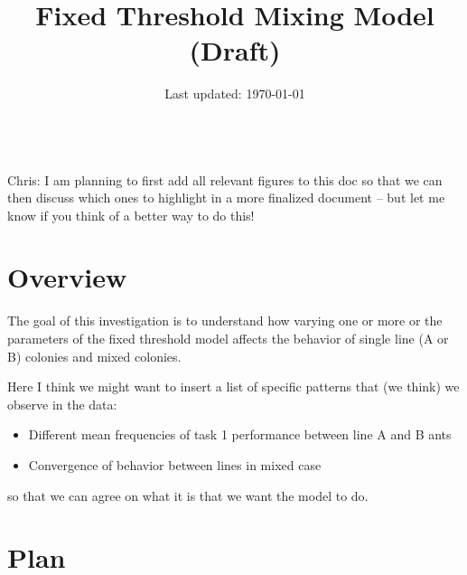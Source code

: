 \documentclass[11pt]{article}
\title{Fixed Threshold Mixing Model ({\color{red}Draft})}
\author{\hspace{0pt}\vspace{-30pt}}
\date{Last updated: \today}
\begin{document}
\maketitle

\tableofcontents
\hspace{0pt}\\
{\color{red}Chris: I am planning to first add all relevant figures to this doc so that we can then discuss which ones to highlight in a more finalized document -- but let me know if you think of a better way to do this!}

\section{Overview}
The goal of this investigation is to understand how varying one or more or the parameters of the fixed threshold model affects the behavior of single line (A or B) colonies and mixed colonies.
\\

{\color{red}
Here I think we might want to insert a list of specific patterns that (we think) we observe in the data:
\begin{itemize}
    \item Different mean frequencies of task 1 performance between line A and B ants
    \item Convergence of behavior between lines in mixed case
\end{itemize}
so that we can agree on what it is that we want the model to do.
}

\section{Plan}
\end{document}
